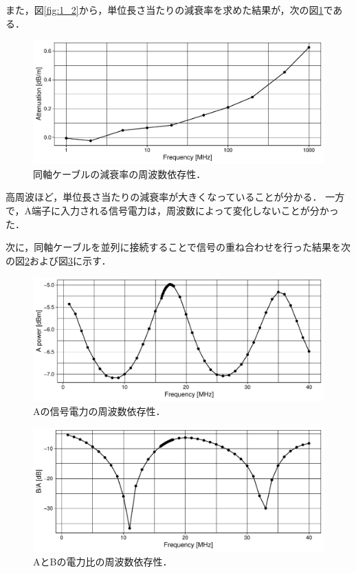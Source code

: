 \documentclass[uplatex,dvipdfmx,a4j,12pt]{jsarticle}
\begin{document}
また，図\ref{fig:1_2}から，単位長さ当たりの減衰率を求めた結果が，次の図\ref{fig:1_3}である．
\begin{figure}[H]
  \centering
  \includegraphics[width=\linewidth]{data/1_1/decay_ratio_vs_freq.pdf}
  \caption{同軸ケーブルの減衰率の周波数依存性．}
  \label{fig:1_3}
\end{figure}

高周波ほど，単位長さ当たりの減衰率が大きくなっていることが分かる．
一方で，A端子に入力される信号電力は，周波数によって変化しないことが分かった．


次に，同軸ケーブルを並列に接続することで信号の重ね合わせを行った結果を次の図\ref{fig:1_4}および図\ref{fig:1_5}に示す．
\begin{figure}[H]
  \centering
  \includegraphics[width=\linewidth]{data/1_2/power_vs_freq.pdf}
  \caption{Aの信号電力の周波数依存性．}
  \label{fig:1_4}
\end{figure}


\begin{figure}[H]
  \centering
  \includegraphics[width=\linewidth]{data/1_2/power_ratio_vs_freq.pdf}
  \caption{AとBの電力比の周波数依存性．}
  \label{fig:1_5}
\end{figure}
\end{document}

